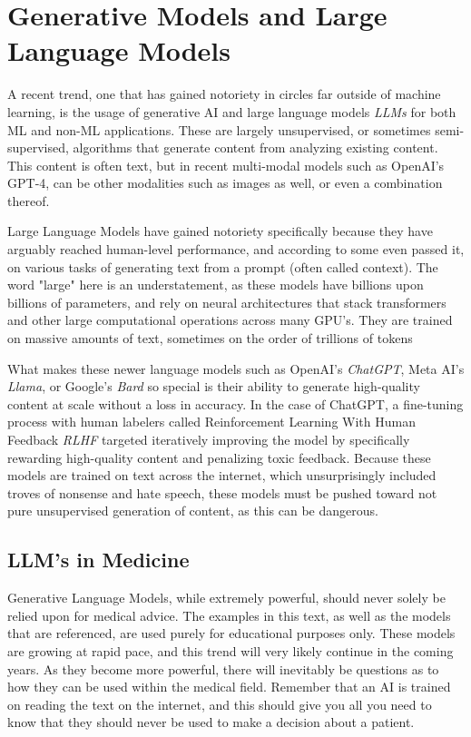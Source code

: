 
\section{Generative Models and Large Language Models}

A recent trend, one that has gained notoriety in circles far outside of machine learning, is the usage of generative AI
and large language models \textit{LLMs} for both ML and non-ML applications. These are largely unsupervised, or sometimes
semi-supervised, algorithms that generate content from analyzing existing content. This content is often text, but in recent
multi-modal models such as OpenAI's GPT-4\cite{openai2023gpt4}, can be other modalities such as images as well, or even a combination thereof.

Large Language Models have gained notoriety specifically because they have arguably reached human-level performance, and according
to some even passed it, on various tasks of generating text from a prompt (often called context). The word "large" here is an understatement,
as these models have billions upon billions of parameters, and rely on neural architectures that stack transformers and other large
computational operations across many GPU's. They are trained on massive amounts of text, sometimes on the order of trillions\cite{touvron2023llama} of tokens

What makes these newer language models such as OpenAI's \textit{ChatGPT}, Meta AI's \textit{Llama}\cite{touvron2023llama}, or Google's \textit{Bard} so special
is their ability to generate high-quality content at scale without a loss in accuracy. In the case of ChatGPT, a fine-tuning process with
human labelers called Reinforcement Learning With Human Feedback \textit{RLHF} targeted iteratively improving the model by specifically
rewarding high-quality content and penalizing toxic feedback. Because these models are trained on text across the internet, which
unsurprisingly included troves of nonsense and hate speech, these models must be pushed toward not pure unsupervised generation of content,
as this can be dangerous.
\subsection{LLM's in Medicine}
Generative Language Models, while extremely powerful, should never solely be relied upon for medical advice. The examples in this text,
as well as the models that are referenced, are used purely for educational purposes only.
These models are growing at rapid pace, and this trend will very likely continue in the coming years. As they become more powerful, there
will inevitably be questions as to how they can be used within the medical field. Remember that an AI is trained on reading the text on the internet,
and this should give you all you need to know that they should never be used to make a decision about a patient.

